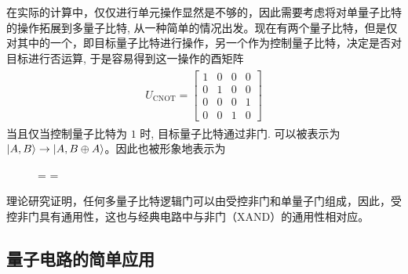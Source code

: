 在实际的计算中，仅仅进行单元操作显然是不够的，因此需要考虑将对单量子比特的操作拓展到多量子比特, 从一种简单的情况出发。现在有两个量子比特，但是仅对其中的一个，即目标量子比特进行操作，另一个作为控制量子比特，决定是否对目标进行否运算, 于是容易得到这一操作的酉矩阵 \begin{align}\begin{aligned}
        U_{\text{CNOT}}=\begin{bmatrix}
                            1 & 0 & 0 & 0 \\
                            0 & 1 & 0 & 0 \\
                            0 & 0 & 0 & 1 \\
                            0 & 0 & 1 & 0
                        \end{bmatrix}
    \end{aligned}\end{align}
当且仅当控制量子比特为 $1$ 时, 目标量子比特通过非门. 可以被表示为 $|A,B\rangle\to|A,B\oplus A\rangle$。因此也被形象地表示为
\begin{figure}[H]
    \label{fig:cnot-gate}
    \centering
    =
    =
\end{figure}

理论研究证明，任何多量子比特逻辑门可以由受控非门和单量子门组成\cite{nielsen2002quantum}，因此，受控非门具有通用性，这也与经典电路中与非门（XAND）的通用性相对应。

\subsection{量子电路的简单应用}

